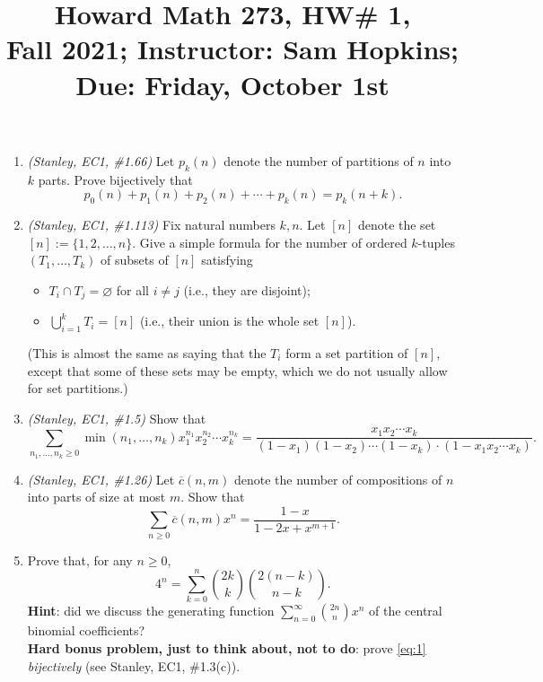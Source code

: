 \documentclass[11pt]{article}
\title{Howard Math 273, HW\# 1, \\ {\normalsize Fall 2021; Instructor: Sam Hopkins; Due: Friday, October 1st}}
\date{}
\begin{document}
\maketitle

\thispagestyle{empty}

\vspace{-1.5cm}

\begin{enumerate}

\item \emph{(Stanley, EC1, \#1.66)} Let $p_k(n)$ denote the number of partitions of $n$ into $k$ parts. Prove bijectively that
\[p_0(n)+p_1(n)+p_2(n)+\cdots + p_k(n) = p_k(n+k).\]

\item \emph{(Stanley, EC1, \#1.113)} Fix natural numbers $k,n$. Let $[n]$ denote the set $[n] := \{1,2,\ldots,n\}$. Give a simple formula for the number of ordered $k$-tuples $(T_1,\ldots,T_k)$ of subsets of $[n]$ satisfying
\begin{itemize}
\item $T_i \cap T_j = \varnothing$ for all $i\neq j$ (i.e., they are disjoint);
\item $\bigcup_{i=1}^{k} T_i = [n]$ (i.e., their union is the whole set $[n]$).
\end{itemize}
(This is almost the same as saying that the $T_i$ form a set partition of $[n]$, except that some of these sets may be empty, which we do not usually allow for set partitions.)

\item \emph{(Stanley, EC1, \#1.5)} Show that 
\[ \sum_{n_1,\ldots, n_k \geq 0} \min(n_1,\ldots,n_k) x_1^{n_1}x_2^{n_2}\cdots x_k^{n_k} = \frac{x_1x_2\cdots x_k}{(1-x_1)(1-x_2)\cdots(1-x_k) \cdot (1-x_1x_2\cdots x_k)}. \]

\item \emph{(Stanley, EC1, \#1.26)} Let $\overline{c}(n,m)$ denote the number of compositions of $n$ into parts of size at most $m$. Show that
\[ \sum_{n\geq 0} \overline{c}(n,m)x^n = \frac{1-x}{1-2x+x^{m+1}}.\]

\item Prove that, for any $n \geq 0$,
\begin{equation} \label{eq:1}
 4^n = \sum_{k=0}^{n} \binom{2k}{k}\binom{2(n-k)}{n-k}.
\end{equation}
{\bf Hint}: did we discuss the generating function $\sum_{n=0}^{\infty} \binom{2n}{n}x^n$ of the central binomial coefficients? \\
{\bf Hard bonus problem, just to think about, not to do}: prove \eqref{eq:1} \emph{bijectively} (see Stanley, EC1, \#1.3(c)).


\end{enumerate}
\end{document}
